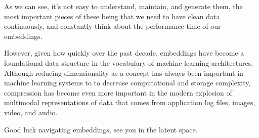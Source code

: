 \documentclass[11pt]{diazessay} %
\begin{document}
As we can see, it's not easy to understand, maintain, and generate them, the most important pieces of these being that we need to have clean data continuously, and constantly think about the performance time of our embeddings. 

However, given how quickly over the past decade, embeddings have become a foundational data structure in the vocabulary of machine learning architectures. Although reducing dimensionality as a concept has always been important in machine learning systems to to decrease computational and storage complexity, compression has become even more important in the modern explosion of multimodal representations of data that comes from application log files, images, video, and audio. 

Good luck navigating embeddings,  see you in the latent space. 


\newpage


\newpage



\end{document}
